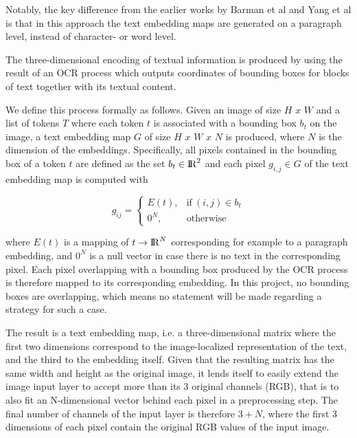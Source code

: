 \documentclass[english, bibtex]{kththesis}
\begin{document}
Notably, the key difference from the earlier works by Barman et al\cite{jdmdh:7097} and Yang et al\cite{DBLP:journals/corr/YangYAKKG17} is that in this approach the text embedding maps are generated on a paragraph level, instead of character- or word level.

The three-dimensional encoding of textual information is produced by using the result of an OCR process which outputs coordinates of bounding boxes for blocks of text together with its textual content.

We define this process formally as follows. Given an image of size $H$ $x$ $W$ and a list of tokens $T$ where each token $t$ is associated with a bounding box $b_t$ on the image, a text embedding map $G$ of size $H$ $x$ $W$ $x$ $N$ is produced, where $N$ is the dimension of the embeddings. Specifically, all pixels contained in the bounding box of a token $t$ are defined as the set $b_t \in {\rm I\!R}^2$ and each pixel $g_{i,j} \in G$ of the text embedding map is computed with 

\begin{equation}
	g_{ij} = 
	    \begin{cases}
	      E(t), & \text{if}\ (i,j) \in b_t \\
	      0^N, & \text{otherwise}
	    \end{cases}
  	\label{eqn:textembedding}
\end{equation}

where $E(t)$ is a mapping of $t \rightarrow {\rm I\!R}^N$ corresponding for example to a paragraph embedding, and $0^N$ is a null vector in case there is no text in the corresponding pixel. Each pixel overlapping with a bounding box produced by the OCR process is therefore mapped to its corresponding embedding. In this project, no bounding boxes are overlapping, which means no statement will be made regarding a strategy for such a case.

The result is a text embedding map, i.e. a three-dimensional matrix where the first two dimensions correspond to the image-localized representation of the text, and the third to the embedding itself. Given that the resulting matrix has the same width and height as the original image, it lends itself to easily extend the image input layer to accept more than its 3 original channels (RGB), that is to also fit an N-dimensional vector behind each pixel in a preprocessing step. The final number of channels of the input layer is therefore $3+N$, where the first 3 dimensions of each pixel contain the original RGB values of the input image. 
\end{document}
